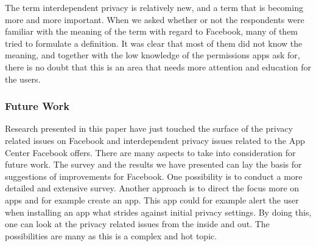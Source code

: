 The term interdependent privacy is relatively new, and a term that is becoming more and more important. When we asked whether or not the respondents were familiar with the meaning of the term with regard to Facebook, many of them tried to formulate a definition. It was clear that most of them did not know the meaning, and together with the low knowledge of the permissions apps ask for, there is no doubt that this is an area that needs more attention and education for the users. 

\subsubsection{Future Work}
Research presented in this paper have just touched the surface of the privacy related issues on Facebook and interdependent privacy issues related to the App Center Facebook offers. There are many aspects to take into consideration for future work. The survey and the results we have presented can lay the basis for suggestions of improvements for Facebook. One possibility is to conduct a more detailed and extensive survey. Another approach is to direct the focus more on apps and for example create an app. This app could for example alert the user when installing an app what strides against initial privacy settings. By doing this, one can look at the privacy related issues from the inside and out. The possibilities are many as this is a complex and hot topic. 


